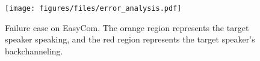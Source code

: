 \begin{figure} %
\centering
\texttt{[image: figures/files/error\_analysis.pdf]}
\caption{Failure case on EasyCom. The orange region represents the target speaker speaking, and the red region represents the target speaker's backchanneling. }
\label{fig:fig9_error_analysis}
\end{figure}
